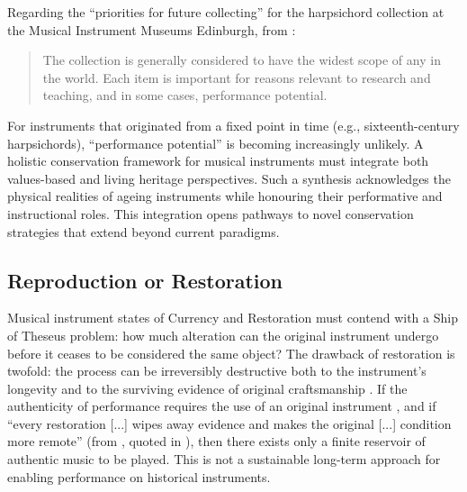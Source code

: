 Regarding the ``priorities for future collecting'' for the harpsichord
collection at the Musical Instrument Museums Edinburgh, from
 \cite{uoe_collections_2020}:

\begin{quotation}
	The collection is generally considered to have the widest scope of any in
	the world. Each item is important for reasons relevant to research and
	teaching, and in some cases, performance potential.
\end{quotation}

For instruments that originated from a fixed point in time (e.g.,
sixteenth-century harpsichords), ``performance potential'' is becoming
increasingly unlikely. A holistic conservation framework for musical instruments
must integrate both values-based and living heritage perspectives. Such a
synthesis acknowledges the physical realities of ageing instruments while
honouring their performative and instructional roles. This integration opens
pathways to novel conservation strategies that extend beyond current paradigms.


\subsection{Reproduction or Restoration}\label{sec:reproduction-or-restoration}

Musical instrument states of Currency and Restoration must contend with a Ship
of Theseus problem: how much alteration can the original instrument undergo
before it ceases to be considered the same object? The drawback of restoration
is twofold: the process can be irreversibly destructive both to the instrument’s
longevity \cite{barclay_care_1997} and to the surviving evidence of original
craftsmanship \cite{karp_restoration_1979}. If the authenticity of performance
requires the use of an original instrument \cite{karp_musical_1985}, and if
``every restoration [...] wipes away evidence and makes the original [...]
condition more remote'' (from \textcite{waitzman_music_1988}, quoted in
\textcite{barclay_critical_1999}), then there exists only a finite reservoir of
authentic music to be played. This is not a sustainable long-term approach for
enabling performance on historical instruments.

